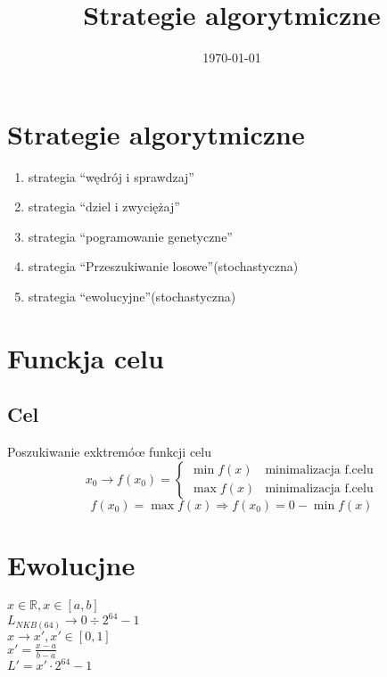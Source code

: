 \documentclass[11pt]{article}
\date{\today}
\title{Strategie algorytmiczne}
\begin{document}
\maketitle
\tableofcontents

\section{Strategie algorytmiczne}
\label{sec:orgf1f7b2e}
\begin{enumerate}
\item strategia ``wędrój i sprawdzaj''
\item strategia ``dziel i zwyciężaj''
\item strategia ``pogramowanie genetyczne''
\item strategia ``Przeszukiwanie losowe''(stochastyczna)
\item strategia ``ewolucyjne''(stochastyczna)
\end{enumerate}
\section{Funckja celu}
\label{sec:org92f7f45}
\subsection{Cel}
\label{sec:org3a81e51}
Poszukiwanie exktremóœ funkcji celu
$$x_0 \to f(x_0) = \begin{cases}
                     \min f(x) & \text{minimalizacja f.celu}\\
                     \max f(x) & \text{minimalizacja f.celu}
\end{cases}$$
$$f(x_0) = \max f(x) \Rightarrow f(x_0) = 0 - \min f(x)$$
\section{Ewolucjne}
\label{sec:org8cc2c0e}
\(x \in \mathbb{R}, x \in [a,b]\)
\\\empty
\(L_{NKB(64)} \to 0 \div 2^{64}-1\)
\\\empty
\(x \to x', x'\in [0,1]\)
\\\empty
\(x'= \frac{x-a}{b-a}\)
\\\empty
\(L' = x' \cdot 2^{64}-1\)
\end{document}
